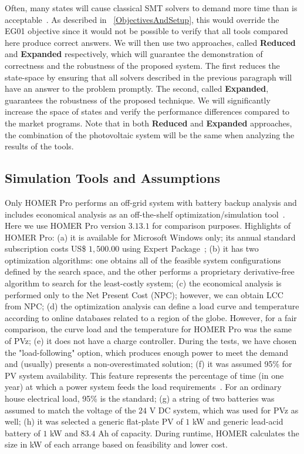 \documentclass[a4paper,donotrepeattitle,fleqn]{cas-dc}
\begin{document}
Often, many states will cause classical SMT solvers to demand more time than is acceptable~\cite{abs-1909-13139}. As described in ~\ref{ObjectivesAndSetup}, this would override the EG01 objective since it would not be possible to verify that all tools compared here produce correct answers. We will then use two approaches, called \textbf{Reduced} and \textbf{Expanded} respectively, which will guarantee the demonstration of correctness and the robustness of the proposed system. The first reduces the state-space by ensuring that all solvers described in the previous paragraph will have an answer to the problem promptly. The second, called \textbf{Expanded}, guarantees the robustness of the proposed technique. We will significantly increase the space of states and verify the performance differences compared to the market programs. Note that in both \textbf{Reduced} and \textbf{Expanded} approaches, the combination of the photovoltaic system will be the same when analyzing the results of the tools.

\subsection{Simulation Tools and Assumptions}
\label{sec:SimulationToolsandAssumptions}

Only HOMER Pro performs an off-grid system with battery backup analysis and includes economical analysis as an off-the-shelf optimization/simulation tool~\cite{Pradhan,Swarnkar}. Here we use HOMER Pro version $3.13.1$ for comparison purposes. Highlights of HOMER Pro:
%
(a) it is available for Microsoft Windows only; its annual standard subscription costs US\$ $1,500.00$ using Expert Package~\cite{HOMER};
(b) it has two optimization algorithms: one obtains all of the feasible system configurations defined by the search space, and the other performs a proprietary derivative-free algorithm to search for the least-costly system;
(c) the economical analysis is performed only to the Net Present Cost (NPC); however, we can obtain LCC from NPC; 
(d) the optimization analysis can define a load curve and temperature according to online databases related to a region of the globe. However, for a fair comparison, the curve load and the temperature for HOMER Pro was the same of PVz; 
(e) it does not have a charge controller. During the tests, we have chosen the "load-following" option, which produces enough power to meet the demand~\cite{HOMER} and (usually) presents a non-overestimated solution; 
(f) it was assumed 95\% for PV system availability. This feature represents the percentage of time (in one year) at which a power system feeds the load requirements~\cite{Khatib2014}. For an ordinary house electrical load, 95\% is the standard;
(g) a string of two batteries was assumed to match the voltage of the $24$ V DC system, which was used for PVz as well; 
(h) it was selected a generic flat-plate PV of $1$ kW and generic lead-acid battery of $1$ kW and $83.4$ Ah of capacity. During runtime, HOMER calculates the size in kW of each arrange based on feasibility and lower cost.
\end{document}

